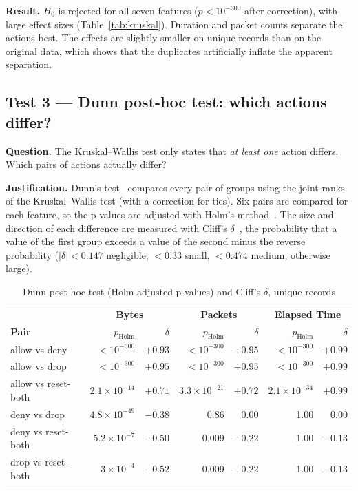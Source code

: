\textbf{Result.} $H_0$ is rejected for all seven features ($p < 10^{-300}$ after correction), with large effect sizes (Table~\ref{tab:kruskal}). Duration and packet counts separate the actions best. The effects are slightly smaller on unique records than on the original data, which shows that the duplicates artificially inflate the apparent separation.

\subsection{Test 3 --- Dunn post-hoc test: which actions differ?}
\textbf{Question.} The Kruskal--Wallis test only states that \emph{at least one} action differs. Which pairs of actions actually differ?

\textbf{Justification.} Dunn's test~\cite{dunn1964multiple} compares every pair of groups using the joint ranks of the Kruskal--Wallis test (with a correction for ties). Six pairs are compared for each feature, so the p-values are adjusted with Holm's method~\cite{holm1979simple}. The size and direction of each difference are measured with Cliff's $\delta$~\cite{cliff1993dominance}, the probability that a value of the first group exceeds a value of the second minus the reverse probability ($|\delta| < 0.147$ negligible, $< 0.33$ small, $< 0.474$ medium, otherwise large).

\begin{table}[htbp]
  \centering
  \caption{Dunn post-hoc test (Holm-adjusted p-values) and Cliff's $\delta$, unique records}
  \label{tab:dunn}
  \small
  \begin{tabular}{|l|r|r|r|r|r|r|}
    \hline
    & \multicolumn{2}{c|}{\textbf{Bytes}} & \multicolumn{2}{c|}{\textbf{Packets}} & \multicolumn{2}{c|}{\textbf{Elapsed Time}} \\
    \textbf{Pair} & $p_{\text{Holm}}$ & $\delta$ & $p_{\text{Holm}}$ & $\delta$ & $p_{\text{Holm}}$ & $\delta$ \\
    \hline
    allow vs deny & $<10^{-300}$ & $+0.93$ & $<10^{-300}$ & $+0.95$ & $<10^{-300}$ & $+0.99$ \\
    allow vs drop & $<10^{-300}$ & $+0.95$ & $<10^{-300}$ & $+0.95$ & $<10^{-300}$ & $+0.99$ \\
    allow vs reset-both & $2.1\times10^{-14}$ & $+0.71$ & $3.3\times10^{-21}$ & $+0.72$ & $2.1\times10^{-34}$ & $+0.99$ \\
    deny vs drop & $4.8\times10^{-49}$ & $-0.38$ & 0.86 & $0.00$ & 1.00 & $0.00$ \\
    deny vs reset-both & $5.2\times10^{-7}$ & $-0.50$ & 0.009 & $-0.22$ & 1.00 & $-0.13$ \\
    drop vs reset-both & $3\times10^{-4}$ & $-0.52$ & 0.009 & $-0.22$ & 1.00 & $-0.13$ \\
    \hline
  \end{tabular}
\end{table}

